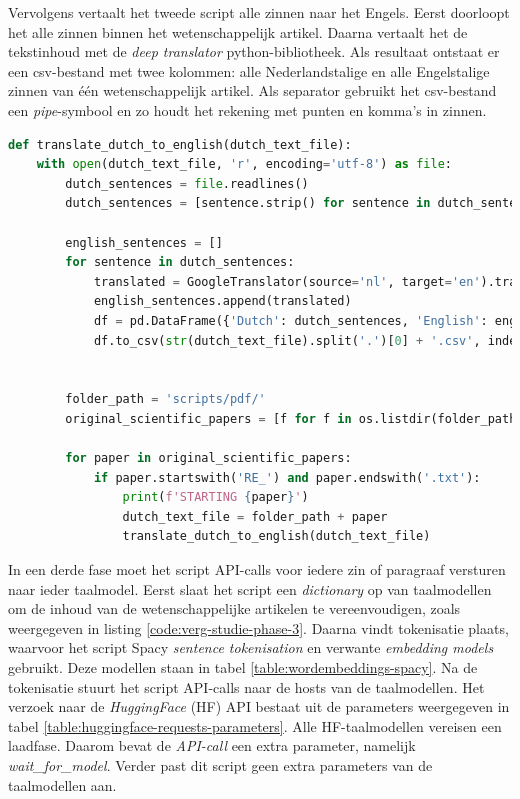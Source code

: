 Vervolgens vertaalt het tweede script alle zinnen naar het Engels. Eerst doorloopt het alle zinnen binnen het wetenschappelijk artikel. Daarna vertaalt het de tekstinhoud met de \textit{deep translator} python-bibliotheek. Als resultaat ontstaat er een csv-bestand met twee kolommen: alle Nederlandstalige en alle Engelstalige zinnen van één wetenschappelijk artikel. Als separator gebruikt het csv-bestand een \textit{pipe}-symbool en zo houdt het rekening met punten en komma's in zinnen.

\begin{center}
	\begin{lstlisting}[language=Python, caption={Script voor de tweede fase van de vergelijkende studie.}, label={code:verg-studie-phase-2}]
def translate_dutch_to_english(dutch_text_file):
	with open(dutch_text_file, 'r', encoding='utf-8') as file:
		dutch_sentences = file.readlines()
		dutch_sentences = [sentence.strip() for sentence in dutch_sentences]
				
		english_sentences = []
		for sentence in dutch_sentences:
			translated = GoogleTranslator(source='nl', target='en').translate(sentence)
			english_sentences.append(translated)
			df = pd.DataFrame({'Dutch': dutch_sentences, 'English': english_sentences})
			df.to_csv(str(dutch_text_file).split('.')[0] + '.csv', index=False)
				
				
		folder_path = 'scripts/pdf/'
		original_scientific_papers = [f for f in os.listdir(folder_path)]
				
		for paper in original_scientific_papers:
			if paper.startswith('RE_') and paper.endswith('.txt'):
				print(f'STARTING {paper}')
				dutch_text_file = folder_path + paper
				translate_dutch_to_english(dutch_text_file)
		\end{lstlisting}
\end{center}

In een derde fase moet het script API-calls voor iedere zin of paragraaf versturen naar ieder taalmodel. Eerst slaat het script een \textit{dictionary} op van taalmodellen om de inhoud van de wetenschappelijke artikelen te vereenvoudigen, zoals weergegeven in listing \ref{code:verg-studie-phase-3}. Daarna vindt tokenisatie plaats, waarvoor het script Spacy \textit{sentence tokenisation} en verwante \textit{embedding models} gebruikt. Deze modellen staan in tabel \ref{table:wordembeddings-spacy}. Na de tokenisatie stuurt het script API-calls naar de hosts van de taalmodellen. Het verzoek naar de \textit{HuggingFace} (HF) API bestaat uit de parameters weergegeven in tabel \ref{table:huggingface-requests-parameters}. Alle HF-taalmodellen vereisen een laadfase. Daarom bevat de \textit{API-call} een extra parameter, namelijk \textit{wait\_for\_model}. Verder past dit script geen extra parameters van de taalmodellen aan. 

